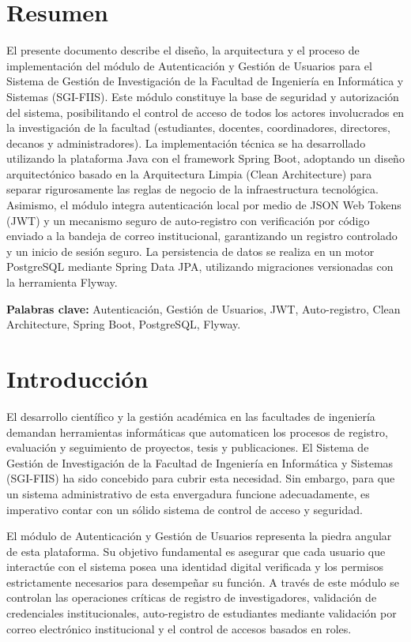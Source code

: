 \documentclass[12pt,letterpaper]{article}
\begin{document}
\section*{Resumen}
El presente documento describe el diseño, la arquitectura y el proceso de implementación del módulo de Autenticación y Gestión de Usuarios para el Sistema de Gestión de Investigación de la Facultad de Ingeniería en Informática y Sistemas (SGI-FIIS). Este módulo constituye la base de seguridad y autorización del sistema, posibilitando el control de acceso de todos los actores involucrados en la investigación de la facultad (estudiantes, docentes, coordinadores, directores, decanos y administradores). La implementación técnica se ha desarrollado utilizando la plataforma Java con el framework Spring Boot, adoptando un diseño arquitectónico basado en la Arquitectura Limpia (Clean Architecture) para separar rigurosamente las reglas de negocio de la infraestructura tecnológica. Asimismo, el módulo integra autenticación local por medio de JSON Web Tokens (JWT) y un mecanismo seguro de auto-registro con verificación por código enviado a la bandeja de correo institucional, garantizando un registro controlado y un inicio de sesión seguro. La persistencia de datos se realiza en un motor PostgreSQL mediante Spring Data JPA, utilizando migraciones versionadas con la herramienta Flyway.

\textbf{Palabras clave:} Autenticación, Gestión de Usuarios, JWT, Auto-registro, Clean Architecture, Spring Boot, PostgreSQL, Flyway.

\newpage

\section{Introducción}
El desarrollo científico y la gestión académica en las facultades de ingeniería demandan herramientas informáticas que automaticen los procesos de registro, evaluación y seguimiento de proyectos, tesis y publicaciones. El Sistema de Gestión de Investigación de la Facultad de Ingeniería en Informática y Sistemas (SGI-FIIS) ha sido concebido para cubrir esta necesidad. Sin embargo, para que un sistema administrativo de esta envergadura funcione adecuadamente, es imperativo contar con un sólido sistema de control de acceso y seguridad.

El módulo de Autenticación y Gestión de Usuarios representa la piedra angular de esta plataforma. Su objetivo fundamental es asegurar que cada usuario que interactúe con el sistema posea una identidad digital verificada y los permisos estrictamente necesarios para desempeñar su función. A través de este módulo se controlan las operaciones críticas de registro de investigadores, validación de credenciales institucionales, auto-registro de estudiantes mediante validación por correo electrónico institucional y el control de accesos basados en roles.
\end{document}
